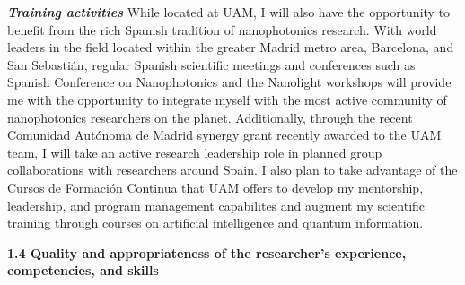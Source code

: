 \documentclass[11pt,a4paper]{article}
\begin{document}
\textbf{\textit{Training activities}} While located at UAM, I will also have the opportunity to benefit from the rich Spanish tradition of nanophotonics research. With world leaders in the field located within the greater Madrid metro area, Barcelona, and San Sebasti\'{a}n, regular Spanish scientific meetings and conferences such as Spanish Conference on Nanophotonics and the Nanolight workshops will provide me with the opportunity to integrate myself with the most active community of nanophotonics researchers on the planet. Additionally, through the recent Comunidad Aut\'{o}noma de Madrid synergy grant recently awarded to the UAM team, I will take an active research leadership role in planned group collaborations with researchers around Spain. I also plan to take advantage of the Cursos de Formaci\'{o}n Continua that UAM offers to develop my mentorship, leadership, and program management capabilites and augment my scientific training through courses on artificial intelligence and quantum information.









\noindent\textbf{1.4 Quality and appropriateness of the researcher's experience, competencies, and skills}
\end{document}
